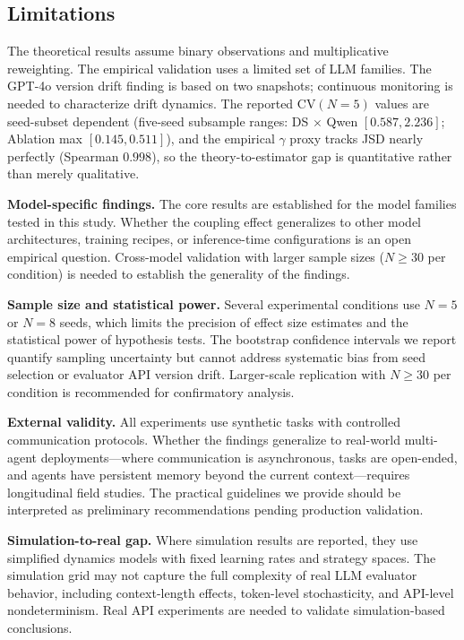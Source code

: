 \documentclass[11pt]{article}
\begin{document}
\subsection{Limitations} The theoretical results assume binary observations and multiplicative reweighting. The empirical validation uses a limited set of LLM families. The GPT-4o version drift finding is based on two snapshots; continuous monitoring is needed to characterize drift dynamics. The reported $\mathrm{CV}(N{=}5)$ values are seed-subset dependent (five-seed subsample ranges: DS $\times$ Qwen $[0.587, 2.236]$; Ablation max $[0.145, 0.511]$), and the empirical $\gamma$ proxy tracks JSD nearly perfectly (Spearman $0.998$), so the theory-to-estimator gap is quantitative rather than merely qualitative.



\textbf{Model-specific findings.} The core results are established for the model families tested in this study. Whether the coupling effect generalizes to other model architectures, training recipes, or inference-time configurations is an open empirical question. Cross-model validation with larger sample sizes ($N{\geq}30$ per condition) is needed to establish the generality of the findings.

\textbf{Sample size and statistical power.} Several experimental conditions use $N{=}5$ or $N{=}8$ seeds, which limits the precision of effect size estimates and the statistical power of hypothesis tests. The bootstrap confidence intervals we report quantify sampling uncertainty but cannot address systematic bias from seed selection or evaluator API version drift. Larger-scale replication with $N{\geq}30$ per condition is recommended for confirmatory analysis.

\textbf{External validity.} All experiments use synthetic tasks with controlled communication protocols. Whether the findings generalize to real-world multi-agent deployments—where communication is asynchronous, tasks are open-ended, and agents have persistent memory beyond the current context—requires longitudinal field studies. The practical guidelines we provide should be interpreted as preliminary recommendations pending production validation.

\textbf{Simulation-to-real gap.} Where simulation results are reported, they use simplified dynamics models with fixed learning rates and strategy spaces. The simulation grid may not capture the full complexity of real LLM evaluator behavior, including context-length effects, token-level stochasticity, and API-level nondeterminism. Real API experiments are needed to validate simulation-based conclusions.
\end{document}
